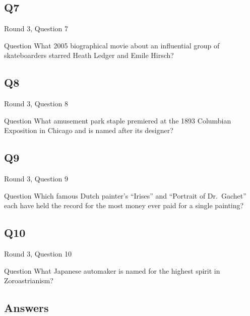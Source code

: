 \documentclass[11pt]{beamer}
\begin{document}
\subsection*{Q7}
\begin{frame}[t]{Round 3, Question 7}
\vspace{2em}
\begin{block}{Question}
What 2005 biographical movie about an influential group of skateboarders starred Heath Ledger and Emile Hirsch\@?
\end{block}
\end{frame}
    

\subsection*{Q8}
\begin{frame}[t]{Round 3, Question 8}
\vspace{2em}
\begin{block}{Question}
What amusement park staple premiered at the 1893 Columbian Exposition in Chicago and is named after its designer\@?
\end{block}
\end{frame}
    

\subsection*{Q9}
\begin{frame}[t]{Round 3, Question 9}
\vspace{2em}
\begin{block}{Question}
Which famous Dutch painter's ``Irises'' and ``Portrait of Dr.\ Gachet'' each have held the record for the most money ever paid for a single painting\@?
\end{block}
\end{frame}
    

\subsection*{Q10}
\begin{frame}[t]{Round 3, Question 10}
\vspace{2em}
\begin{block}{Question}
What Japanese automaker is named for the highest spirit in Zoroastrianism\@?
\end{block}
\end{frame}
    
\subsection{Answers}
\end{document}
